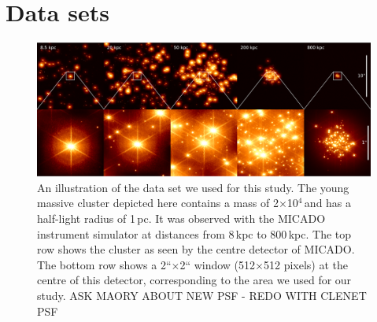 \section{Data sets}
\label{sec:observations}


\begin{figure}

    \centering
    \includegraphics[width=\textwidth]{images/5_clusters.pdf}

    \caption{An illustration of the data set we used for this study. The young massive cluster depicted here contains a mass of 2$\times$10$^4$\,\msun and has a half-light radius of 1\,pc. It was observed with the MICADO instrument simulator at distances from 8\,kpc to 800\,kpc. The top row shows the cluster as seen by the centre detector of MICADO. The bottom row shows a 2``$\times$2`` window (512$\times$512 pixels) at the centre of this detector, corresponding to the area we used for our study. \rewrite ASK MAORY ABOUT NEW PSF - REDO WITH CLENET PSF
    }
    
    \label{fig:5_clusters}
    
\end{figure}


